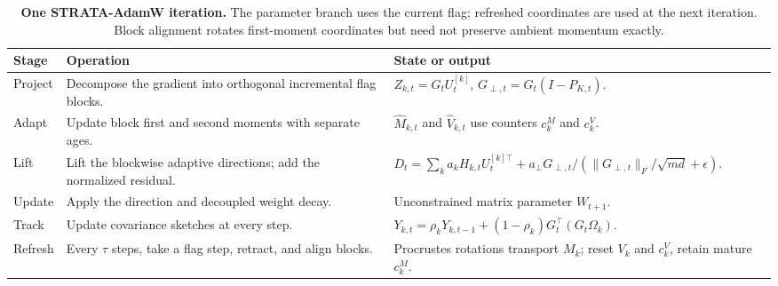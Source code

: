 \begin{table}[t]
\centering
\caption{\textbf{One STRATA-AdamW iteration.} The parameter branch uses the current flag; refreshed coordinates are used at the next iteration. Block alignment rotates first-moment coordinates but need not preserve ambient momentum exactly.}
\label{tab:method-update}
\begin{tabularx}{\textwidth}{@{}l>{\raggedright\arraybackslash}p{}>{\raggedright\arraybackslash}X@{}}
\toprule
\textbf{Stage} & \textbf{Operation} & \textbf{State or output} \\
\midrule
Project & Decompose the gradient into orthogonal incremental flag blocks. & $Z_{k,t}=G_tU_t^{[k]}$, \quad $G_{\perp,t}=G_t(I-P_{K,t})$. \\
Adapt & Update block first and second moments with separate ages. & $\widehat M_{k,t}$ and $\widehat V_{k,t}$ use counters $c_k^M$ and $c_k^V$. \\
Lift & Lift the blockwise adaptive directions; add the normalized residual. & $D_t=\sum_k a_kH_{k,t}U_t^{[k]\top}+a_\perp G_{\perp,t}/(\|G_{\perp,t}\|_F/\sqrt{md}+\epsilon)$. \\
Update & Apply the direction and decoupled weight decay. & Unconstrained matrix parameter $W_{t+1}$. \\
\midrule
\rowcolor{oursbg}
Track & Update covariance sketches at every step. & $Y_{k,t}=\rho_kY_{k,t-1}+(1-\rho_k)G_t^\top(G_t\Omega_k)$. \\
\rowcolor{oursbg}
Refresh & Every $\tau$ steps, take a flag step, retract, and align blocks. & Procrustes rotations transport $M_k$; reset $V_k$ and $c_k^V$, retain mature $c_k^M$. \\
\bottomrule
\end{tabularx}
\end{table}
